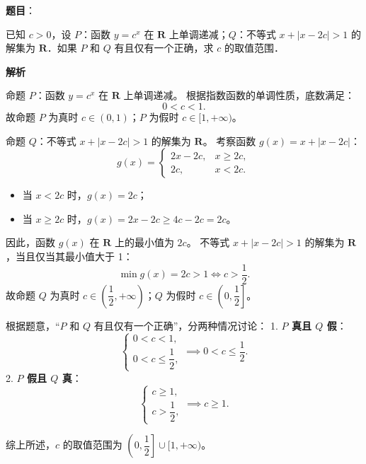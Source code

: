 \begin{answer}

\textbf{题目}：

已知 $c > 0$，设 $P$：函数 $y = c^x$ 在 $\mathbf{R}$ 上单调递减；$Q$：不等式 $x + |x - 2c| > 1$ 的解集为 $\mathbf{R}$．如果 $P$ 和 $Q$ 有且仅有一个正确，求 $c$ 的取值范围．

\textbf{解析}

命题 $P$：函数 $y = c^x$ 在 $\mathbf{R}$ 上单调递减。
根据指数函数的单调性质，底数满足：
\nopagebreak[4]
\[0 < c < 1.\]
故命题 $P$ 为真时 $c \in (0, 1)$；$P$ 为假时 $c \in [1, +\infty)$。

命题 $Q$：不等式 $x + |x - 2c| > 1$ 的解集为 $\mathbf{R}$。
考察函数 $g(x) = x + |x - 2c|$：
\nopagebreak[4]
\[g(x) = \begin{cases} 2x - 2c, & x \ge 2c, \\ 2c, & x < 2c. \end{cases}\]
\begin{itemize}
\item 当 $x < 2c$ 时，$g(x) = 2c$；
\item 当 $x \ge 2c$ 时，$g(x) = 2x - 2c \ge 4c - 2c = 2c$。
\end{itemize}
因此，函数 $g(x)$ 在 $\mathbf{R}$ 上的最小值为 $2c$。
不等式 $x + |x - 2c| > 1$ 的解集为 $\mathbf{R}$，当且仅当其最小值大于 1：
\nopagebreak[4]
\[\min g(x) = 2c > 1 \iff c > \frac{1}{2}.\]
故命题 $Q$ 为真时 $c \in \left(\dfrac{1}{2}, +\infty\right)$；$Q$ 为假时 $c \in \left(0, \dfrac{1}{2}\right]$。

根据题意，“$P$ 和 $Q$ 有且仅有一个正确”，分两种情况讨论：
1. \textbf{$P$ 真且 $Q$ 假}：
\nopagebreak[4]
\[\begin{cases} 0 < c < 1, \\ 0 < c \le \dfrac{1}{2}, \end{cases} \implies 0 < c \le \frac{1}{2}.\]
2. \textbf{$P$ 假且 $Q$ 真}：
\nopagebreak[4]
\[\begin{cases} c \ge 1, \\ c > \dfrac{1}{2}, \end{cases} \implies c \ge 1.\]

综上所述，$c$ 的取值范围为 $\left(0, \dfrac{1}{2}\right] \cup [1, +\infty)$。

\gkanswer{答案：$\left(0, \dfrac{1}{2}\right] \cup [1, +\infty)$}

\end{answer}
